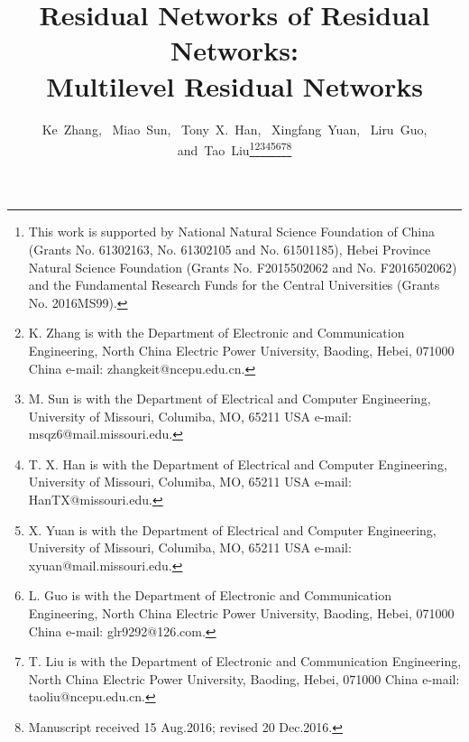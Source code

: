 \documentclass[journal]{IEEEtran}
\begin{document}
\title{Residual Networks of Residual Networks:\\ Multilevel Residual Networks}


\author{Ke~Zhang,~
        Miao~Sun,~
        Tony~X.~Han,~
        Xingfang~Yuan,~
        Liru~Guo,
        and~Tao~Liu\thanks{This work is supported by National Natural Science Foundation of China (Grants No. 61302163, No. 61302105 and No. 61501185), Hebei Province Natural Science Foundation (Grants No. F2015502062 and No. F2016502062) and the Fundamental Research Funds for the Central Universities (Grants No. 2016MS99).}\thanks{K. Zhang is with the Department
of Electronic and Communication Engineering, North China Electric Power University, Baoding,
Hebei, 071000 China e-mail: zhangkeit@ncepu.edu.cn.}\thanks{M. Sun is with the Department
	of Electrical and Computer Engineering, University of Missouri, Columiba,
	MO, 65211 USA e-mail: msqz6@mail.missouri.edu.}\thanks{T. X. Han is with the Department
	of Electrical and Computer Engineering, University of Missouri, Columiba,
	MO, 65211 USA e-mail: HanTX@missouri.edu.}\thanks{X. Yuan is with the Department
	of Electrical and Computer Engineering, University of Missouri, Columiba,
	MO, 65211 USA e-mail: xyuan@mail.missouri.edu.}\thanks{L. Guo is with the Department
	of Electronic and Communication Engineering, North China Electric Power University, Baoding,
	Hebei, 071000 China e-mail: glr9292@126.com.}\thanks{T. Liu is with the Department
	of Electronic and Communication Engineering, North China Electric Power University, Baoding,
	Hebei, 071000 China e-mail: taoliu@ncepu.edu.cn.}\thanks{Manuscript received 15 Aug.2016; revised  20 Dec.2016.}}






















\maketitle
\end{document}
